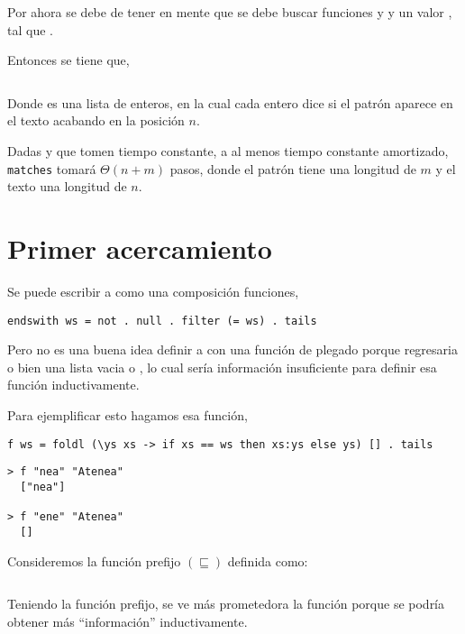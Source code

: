 Por ahora se debe de tener en mente que se debe buscar funciones  y  y un valor ,
tal que .

Entonces se tiene que,

\inputminted{haskell}{definiciones/kmp/1-matches.hs}

Donde  es una lista de enteros, en la cual cada entero  dice si el patrón  aparece en el texto
 acabando en la posición $n$.

Dadas  y  que tomen tiempo constante, a al menos tiempo constante amortizado, \texttt{matches} tomará $\Theta(n + m)$ pasos, donde
el patrón tiene una longitud de $m$ y el texto una longitud de $n$.


\section{Primer acercamiento}

Se puede escribir a  como una composición funciones,

\begin{verbatim}
endswith ws = not . null . filter (= ws) . tails
\end{verbatim}

Pero no es una buena idea definir a  con una función de plegado 
porque regresaria o bien una lista vacia o \hsCode{[ws]}, lo cual sería información insuficiente
para definir esa función inductivamente.

Para ejemplificar esto hagamos esa función,
\begin{verbatim}
f ws = foldl (\ys xs -> if xs == ws then xs:ys else ys) [] . tails
\end{verbatim}

\begin{verbatim}
> f "nea" "Atenea"
  ["nea"]

> f "ene" "Atenea"
  []
\end{verbatim}

Consideremos la función prefijo $(\sqsubseteq)$ definida como:

\inputminted{haskell}{definiciones/prefix.hs}

Teniendo la función prefijo, se ve más prometedora la función  porque
se podría obtener más ``información'' inductivamente.

